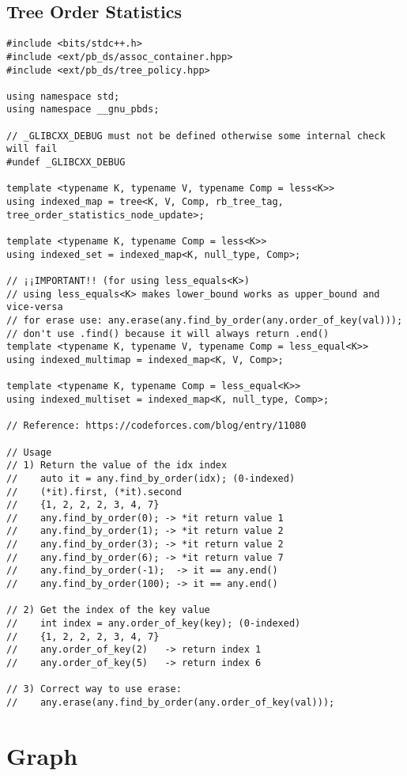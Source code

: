 \documentclass[10pt,letterpaper,twocolumn,twosided]{article}
\begin{document}
\subsection{Tree Order Statistics}
\begin{lstlisting}
#include <bits/stdc++.h>
#include <ext/pb_ds/assoc_container.hpp> 
#include <ext/pb_ds/tree_policy.hpp>

using namespace std;
using namespace __gnu_pbds;

// _GLIBCXX_DEBUG must not be defined otherwise some internal check will fail
#undef _GLIBCXX_DEBUG

template <typename K, typename V, typename Comp = less<K>>
using indexed_map = tree<K, V, Comp, rb_tree_tag, tree_order_statistics_node_update>;

template <typename K, typename Comp = less<K>>
using indexed_set = indexed_map<K, null_type, Comp>;

// ¡¡IMPORTANT!! (for using less_equals<K>)
// using less_equals<K> makes lower_bound works as upper_bound and vice-versa
// for erase use: any.erase(any.find_by_order(any.order_of_key(val)));
// don't use .find() because it will always return .end()
template <typename K, typename V, typename Comp = less_equal<K>>
using indexed_multimap = indexed_map<K, V, Comp>;

template <typename K, typename Comp = less_equal<K>>
using indexed_multiset = indexed_map<K, null_type, Comp>;

// Reference: https://codeforces.com/blog/entry/11080

// Usage
// 1) Return the value of the idx index
//    auto it = any.find_by_order(idx); (0-indexed)
//    (*it).first, (*it).second
//    {1, 2, 2, 2, 3, 4, 7}
//    any.find_by_order(0); -> *it return value 1
//    any.find_by_order(1); -> *it return value 2
//    any.find_by_order(3); -> *it return value 2
//    any.find_by_order(6); -> *it return value 7
//    any.find_by_order(-1);  -> it == any.end()
//    any.find_by_order(100); -> it == any.end()

// 2) Get the index of the key value
//    int index = any.order_of_key(key); (0-indexed)
//    {1, 2, 2, 2, 3, 4, 7}
//    any.order_of_key(2)   -> return index 1
//    any.order_of_key(5)   -> return index 6

// 3) Correct way to use erase:
//    any.erase(any.find_by_order(any.order_of_key(val)));
\end{lstlisting}

\section{Graph}
\end{document}
